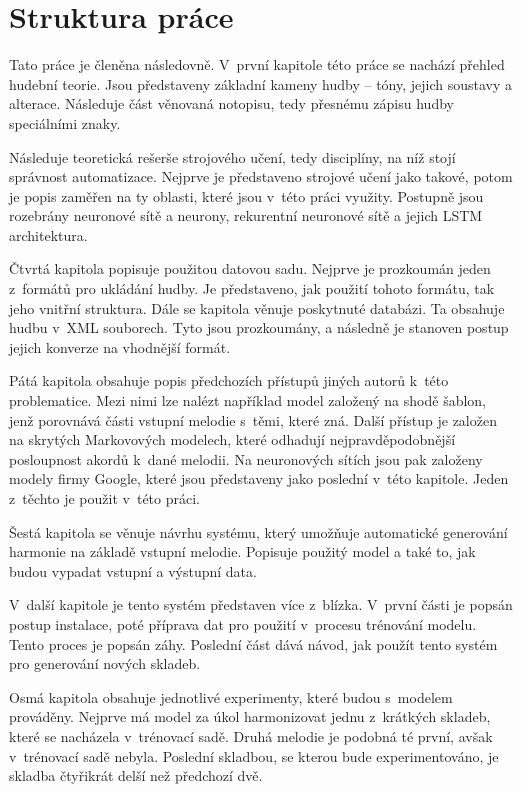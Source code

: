 \section{Struktura práce}
Tato práce je členěna následovně.
V~první kapitole této práce se nachází přehled hudební teorie.
Jsou představeny základní kameny hudby -- tóny, jejich soustavy a alterace.
Následuje část věnovaná notopisu,
tedy přesnému zápisu hudby speciálními znaky.
\par
Následuje teoretická rešerše strojového učení,
tedy disciplíny, na níž stojí správnost automatizace.
Nejprve je představeno strojové učení jako takové,
potom je popis zaměřen na ty oblasti, 
které jsou v~této práci využity.
Postupně jsou rozebrány neuronové sítě a neurony,
rekurentní neuronové sítě a jejich LSTM architektura.
\par
Čtvrtá kapitola popisuje použitou datovou sadu.
Nejprve je prozkoumán jeden z~formátů pro ukládání hudby.
Je představeno, jak použití tohoto formátu, tak jeho vnitřní struktura.
Dále se kapitola věnuje poskytnuté databázi.
Ta obsahuje hudbu v~XML souborech.
Tyto jsou prozkoumány, a následně je stanoven postup jejich konverze na vhodnější formát.

Pátá kapitola obsahuje popis předchozích přístupů jiných autorů k~této problematice.
Mezi nimi lze nalézt například model založený na shodě šablon, 
jenž porovnává části vstupní melodie s~těmi, které zná.
Další přístup je založen na skrytých Markovových modelech, 
které odhadují nejpravděpodobnější posloupnost akordů k~dané melodii.
Na neuronových sítích jsou pak založeny modely firmy Google,
které jsou představeny jako poslední v~této kapitole.
Jeden z~těchto je použit v~této práci.
\par

Šestá kapitola se věnuje návrhu systému,
který umožňuje automatické generování harmonie na základě vstupní melodie.
Popisuje použitý model a také to, jak budou vypadat vstupní a výstupní data.
\par

V~další kapitole je tento systém představen více z~blízka.
V~první části je popsán postup instalace, 
poté příprava dat pro použití v~procesu trénování modelu.
Tento proces je popsán záhy.
Poslední část dává návod, jak použít tento systém pro generování nových skladeb.
\par

Osmá kapitola obsahuje jednotlivé experimenty, 
které budou s~modelem prováděny.
Nejprve má model za úkol harmonizovat jednu z~krátkých skladeb,
které se nacházela v~trénovací sadě.
Druhá melodie je podobná té první, 
avšak v~trénovací sadě nebyla.
Poslední skladbou, se kterou bude experimentováno,
je skladba čtyřikrát delší než předchozí dvě.
\par

